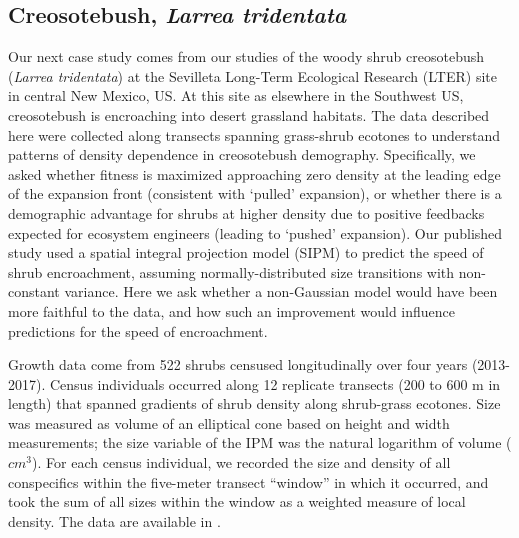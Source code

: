 \documentclass[12pt]{article}
\begin{document}
\begin{spacing}{1.35}
	\subsection{Creosotebush, \emph{Larrea tridentata}}
	\label{sec:creosotebush}
	Our next case study comes from our studies of the woody shrub creosotebush (\emph{Larrea tridentata}) at the Sevilleta Long-Term Ecological Research (LTER) site in central New Mexico, US. 
	At this site as elsewhere in the Southwest US, creosotebush is encroaching into desert grassland habitats.
	The data described here were collected along transects spanning grass-shrub ecotones to understand patterns of density dependence in creosotebush demography.
	Specifically, we asked whether fitness is maximized approaching zero density at the leading edge of the expansion front (consistent with `pulled' expansion), or whether there is a demographic advantage for shrubs at higher density due to positive feedbacks expected for ecosystem engineers (leading to `pushed' expansion). 
	Our published study \citep{drees2023demography} used a spatial integral projection model (SIPM) to predict the speed of shrub encroachment, assuming normally-distributed size transitions with non-constant variance. 
	Here we ask whether a non-Gaussian model would have been more faithful to the data, and how such an improvement would influence predictions for the speed of encroachment.
	
	Growth data come from 522 shrubs censused longitudinally over four years (2013-2017). 
	Census individuals occurred along 12 replicate transects (200 to 600 m in length) that spanned gradients of shrub density along shrub-grass ecotones. 
	Size was measured as volume of an elliptical cone based on height and width measurements; the size variable of the IPM was the natural logarithm of volume ($cm^3$). 
	For each census individual, we recorded the size and density of all conspecifics within the five-meter transect ``window'' in which it occurred, and took the sum of all sizes within the window as a weighted measure of local density. 
	The data are available in \cite{shrubdata}. 
	

\end{spacing}
\end{document}
